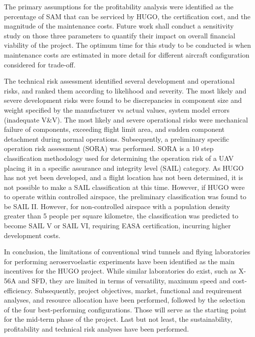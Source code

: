The primary assumptions for the profitability analysis were identified as the percentage of SAM that can be serviced by HUGO, the certification cost, and the magnitude of the maintenance costs. Future work shall conduct a sensitivity study on those three parameters to quantify their impact on overall financial viability of the project. The optimum time for this study to be conducted is when maintenance costs are estimated in more detail for different aircraft configuration considered for trade-off.

The technical risk assessment identified several development and operational risks, and ranked them according to likelihood and severity. The most likely and severe development risks were found to be discrepancies in component size and weight specified by the manufacturer vs actual values, system model errors (inadequate V\&V). The most likely and severe operational risks were mechanical failure of components, exceeding flight limit area, and sudden component detachment during normal operations. Subsequently, a preliminary specific operation risk assessment (SORA) was performed. SORA is a 10 step classification methodology used for determining the operation risk of a UAV placing it in a specific assurance and integrity level (SAIL) category. As HUGO has not yet been developed, and a flight location has not been determined, it is not possible to make a SAIL classification at this time. However, if HUGO were to operate within controlled airspace, the preliminary classification was found to be SAIL II. However, for non-controlled airspace with a population density greater than 5 people per square kilometre, the classification was predicted to become SAIL V or SAIL VI, requiring EASA certification, incurring higher development costs.

In conclusion, the limitations of conventional wind tunnels and flying laboratories for performing aeroservoelastic experiments have been identified as the main incentives for the HUGO project. While similar laboratories do exist, such as X-56A and SFD, they are limited in terms of versatility, maximum speed and cost-efficiency. Subsequently, project objectives, market, functional and requirement analyses, and resource allocation have been performed, followed  by the selection of the four best-performing configurations. Those will serve as the starting point for the mid-term phase of the project. Last but not least, the sustainability, profitability and technical risk analyses have been performed.

